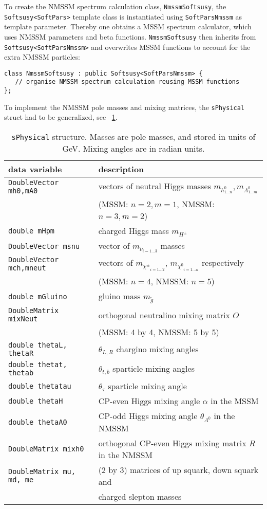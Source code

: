 \documentclass[final,3p,times,pdflatex]{elsarticle}
\def\code#1{\small{\tt #1}\normalsize}
\begin{document}
To create the NMSSM spectrum calculation class, \code{NmssmSoftsusy},
the \code{Softsusy<SoftPars>} template class is instantiated using
\code{SoftParsNmssm} as template parameter.  Thereby one obtains a
MSSM spectrum calculator, which uses NMSSM parameters and beta
functions.  \code{NmssmSoftsusy} then inherits from
\code{Softsusy<SoftParsNmssm>} and overwrites MSSM functions to
account for the extra NMSSM particles:
%
\begin{verbatim}
class NmssmSoftsusy : public Softsusy<SoftParsNmssm> {
   // organise NMSSM spectrum calculation reusing MSSM functions
};
\end{verbatim}
%
To implement the NMSSM pole masses and mixing matrices, the
\code{sPhysical} struct had to be generalized, see
\tablename~\ref{tab:sphys}.
%
\begin{table}
  \centering
  \begin{tabular}{ll}
    data variable & description \\ \hline
    \code{DoubleVector mh0,mA0} & vectors of neutral Higgs masses $m_{h^0_{1\ldots n}}, m_{A^0_{1\ldots m}}$\\
    & (MSSM: $n=2, m=1$, NMSSM: $n=3, m=2$) \\
    \code{double mHpm} & charged Higgs mass $m_{H^\pm}$ \\
    \code{DoubleVector msnu} & vector of $m_{{\tilde \nu}_{i=1 \ldots 3}}$ masses \\
    \code{DoubleVector mch,mneut} & vectors of $m_{{\chi^\pm}_{i=1 \ldots 2}}$, 
    $m_{{\chi^0}_{i=1 \ldots n}}$ respectively \\
    & (MSSM: $n=4$, NMSSM: $n=5$) \\
    \code{double mGluino} & gluino mass $m_{\tilde g}$ \\
    \code{DoubleMatrix mixNeut} & orthogonal neutralino mixing matrix $O$\\
    & (MSSM: 4 by 4, NMSSM: 5 by 5)\\
    \code{double thetaL, thetaR} & $\theta_{L, R}$ chargino mixing angles \\
    \code{double thetat, thetab} & $\theta_{t,b}$ sparticle mixing angles \\
    \code{double thetatau} & $\theta_{\tau}$ sparticle mixing angle \\
    \code{double thetaH} & CP-even Higgs mixing angle $\alpha$ in the MSSM \\
    \code{double thetaA0} & CP-odd Higgs mixing angle $\theta_{A^0}$ in the NMSSM \\
    \code{DoubleMatrix mixh0} & orthogonal CP-even Higgs mixing matrix $R$ in the NMSSM \\
    \code{DoubleMatrix mu, md, me} & (2 by 3) matrices of up squark, down squark
    and\\
    &  charged slepton masses \\
  \end{tabular}
  \caption{\label{tab:sphys}\code{sPhysical} structure. Masses are pole
    masses, and stored in units of GeV. Mixing angles are in radian
    units.}
\end{table}
\end{document}

